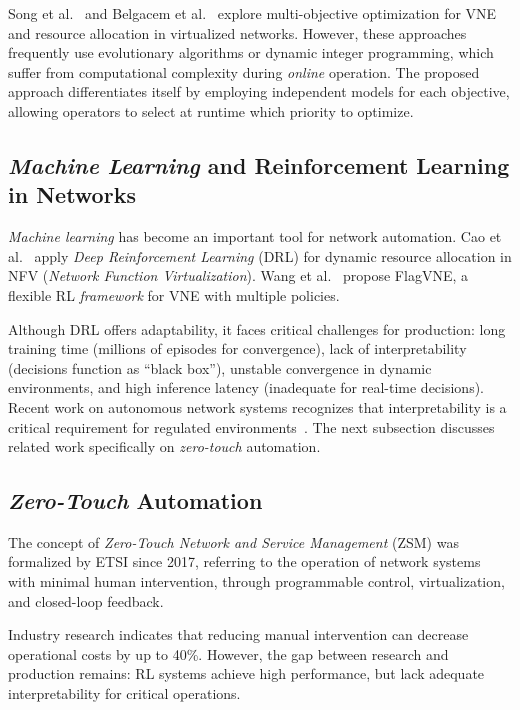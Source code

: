 \documentclass[conference]{IEEEtran}
\begin{document}
Song et al.~\cite{song2020multiobjective} and Belgacem et al.~\cite{belgacem2016multiobjective} explore multi-objective optimization for VNE and resource allocation in virtualized networks. However, these approaches frequently use evolutionary algorithms or dynamic integer programming, which suffer from computational complexity during \textit{online} operation. The proposed approach differentiates itself by employing independent models for each objective, allowing operators to select at runtime which priority to optimize.

\subsection{\textit{Machine Learning} and Reinforcement Learning in Networks}
\label{subsec:ml-networks}

\textit{Machine learning} has become an important tool for network automation.
Cao et al.~\cite{cao2018nfv-deeprl} apply \textit{Deep Reinforcement Learning} (DRL) for dynamic resource allocation in NFV (\textit{Network Function Virtualization}).
Wang et al.~\cite{ijcai-2024-flagvne} propose FlagVNE, a flexible RL \textit{framework} for VNE with multiple policies.

Although DRL offers adaptability, it faces critical challenges for production: long training time (millions of episodes for convergence), lack of interpretability (decisions function as ``black box''), unstable convergence in dynamic environments, and high inference latency (inadequate for real-time decisions).
Recent work on autonomous network systems recognizes that interpretability is a critical requirement for regulated environments~\cite{white2024zerotough}. The next subsection discusses related work specifically on \textit{zero-touch} automation.

\subsection{\textit{Zero-Touch} Automation}
\label{subsec:zerotouchj}

The concept of \textit{Zero-Touch Network and Service Management} (ZSM) was formalized by ETSI since 2017, referring to the operation of network systems with minimal human intervention, through programmable control, virtualization, and closed-loop feedback.

Industry research indicates that reducing manual intervention can decrease operational costs by up to 40\%.
However, the gap between research and production remains: RL systems achieve high performance, but lack adequate interpretability for critical operations.
\end{document}
